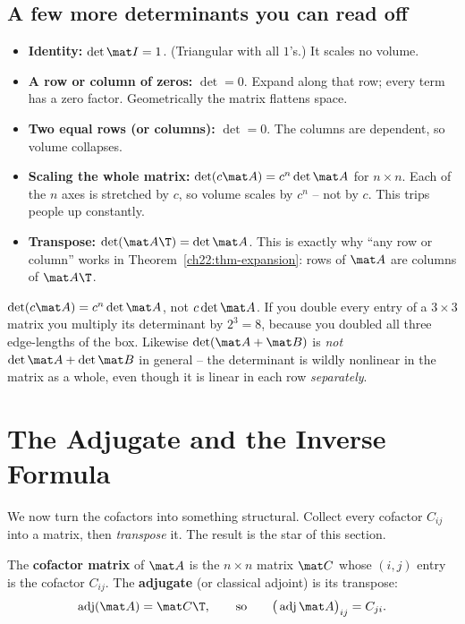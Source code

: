 \subsection{A few more determinants you can read off}

\begin{itemize}
\item \textbf{Identity:} $\det\mat I = 1$. (Triangular with all $1$'s.) It scales no volume.
\item \textbf{A row or column of zeros:} $\det = 0$. Expand along that row; every term has a zero
  factor. Geometrically the matrix flattens space.
\item \textbf{Two equal rows (or columns):} $\det=0$. The columns are dependent, so volume collapses.
\item \textbf{Scaling the whole matrix:} $\det(c\mat A)=c^n\det\mat A$ for $n\times n$. Each of the
  $n$ axes is stretched by $c$, so volume scales by $c^n$ -- not by $c$. This trips people up
  constantly.
\item \textbf{Transpose:} $\det(\mat A\T)=\det\mat A$. This is exactly why ``any row or column'' works
  in Theorem~\ref{ch22:thm-expansion}: rows of $\mat A$ are columns of $\mat A\T$.
\end{itemize}

\begin{trapbox}
$\det(c\mat A)=c^n\det\mat A$, not $c\det\mat A$. If you double every entry of a $3\times3$ matrix you
multiply its determinant by $2^3=8$, because you doubled all three edge-lengths of the box. Likewise
$\det(\mat A+\mat B)$ is \emph{not} $\det\mat A+\det\mat B$ in general -- the determinant is wildly
nonlinear in the matrix as a whole, even though it is linear in each row \emph{separately}.
\end{trapbox}

\section{The Adjugate and the Inverse Formula}

We now turn the cofactors into something structural. Collect every cofactor $C_{ij}$ into a matrix,
then \emph{transpose} it. The result is the star of this section.

\begin{definition}[Adjugate]\label{ch22:def-adj}
The \textbf{cofactor matrix} of $\mat A$ is the $n\times n$ matrix $\mat C$ whose $(i,j)$ entry is the
cofactor $C_{ij}$. The \textbf{adjugate} (or classical adjoint) is its transpose:
\[
\operatorname{adj}(\mat A) = \mat C\T,
\qquad\text{so}\qquad
\big(\operatorname{adj}\mat A\big)_{ij} = C_{ji}.
\]
\end{definition}

